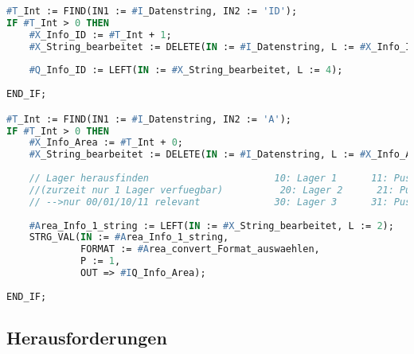     \begin{lstlisting}[language=Pascal, caption={SCL Baustein ``ID+Area''}]
        #T_Int := FIND(IN1 := #I_Datenstring, IN2 := 'ID');
IF #T_Int > 0 THEN
    #X_Info_ID := #T_Int + 1;
    #X_String_bearbeitet := DELETE(IN := #I_Datenstring, L := #X_Info_ID, P := 1); //Alles bis inkl. X wegschneiden
    
    #Q_Info_ID := LEFT(IN := #X_String_bearbeitet, L := 4);               // 4 Zeichen links von X nehmen
    
END_IF;

#T_Int := FIND(IN1 := #I_Datenstring, IN2 := 'A');
IF #T_Int > 0 THEN
    #X_Info_Area := #T_Int + 0;
    #X_String_bearbeitet := DELETE(IN := #I_Datenstring, L := #X_Info_Area, P := 1);
    
    // Lager herausfinden                      10: Lager 1      11: Puscher (Lager 1)       00: Komissionierstation
    //(zurzeit nur 1 Lager verfuegbar)          20: Lager 2      21: Puscher (Lager 2)       01: Foerderband
    // -->nur 00/01/10/11 relevant             30: Lager 3      31: Puscher (Lager 3)
    
    #Area_Info_1_string := LEFT(IN := #X_String_bearbeitet, L := 2);
    STRG_VAL(IN := #Area_Info_1_string,                                         
             FORMAT := #Area_convert_Format_auswaehlen,
             P := 1,
             OUT => #IQ_Info_Area);
    
END_IF;
    \end{lstlisting}


\subsection{Herausforderungen}
